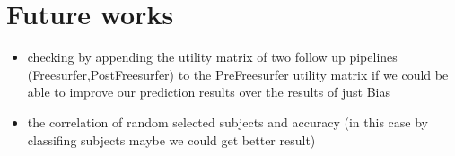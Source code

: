\section{Future works}
\begin{tcolorbox}
        \begin{itemize}
                \item checking by appending the utility matrix of two follow up pipelines (Freesurfer,PostFreesurfer)
                to the PreFreesurfer utility matrix if we could be able to improve our prediction results over the results
                of just Bias
                \item the correlation of random selected subjects and accuracy (in this case by classifing subjects maybe we could get better result)

\end{itemize}
\end{tcolorbox}
